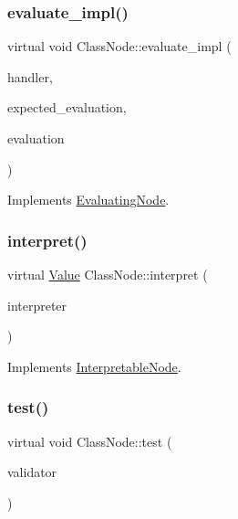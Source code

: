 \subsubsection{\texorpdfstring{evaluate\+\_\+impl()}{evaluate\_impl()}}
{\footnotesize\ttfamily virtual void Class\+Node\+::evaluate\+\_\+impl (\begin{DoxyParamCaption}\item[{\hyperlink{classSystemHandler}{System\+Handler} $\ast$}]{handler,  }\item[{\hyperlink{statics_8h_a6664c451ca7787483a7981cc1de68dbb}{E\+V\+A\+L\+U\+A\+T\+I\+O\+N\+\_\+\+T\+Y\+PE}}]{expected\+\_\+evaluation,  }\item[{struct \hyperlink{structEvaluation}{Evaluation} $\ast$}]{evaluation }\end{DoxyParamCaption})\hspace{0.3cm}{\ttfamily [virtual]}}



Implements \hyperlink{classEvaluatingNode_a085fa06e0b46a93c814dc55cda0c1b26}{Evaluating\+Node}.

\mbox{\label{classClassNode_a7515421face64d74e99e180fb297684b}} 
\subsubsection{\texorpdfstring{interpret()}{interpret()}}
{\footnotesize\ttfamily virtual \hyperlink{classValue}{Value} Class\+Node\+::interpret (\begin{DoxyParamCaption}\item[{\hyperlink{classInterpreter}{Interpreter} $\ast$}]{interpreter }\end{DoxyParamCaption})\hspace{0.3cm}{\ttfamily [virtual]}}



Implements \hyperlink{classInterpretableNode_a9a466e7d65c4b323d2b96b4ac8396cd7}{Interpretable\+Node}.

\mbox{\label{classClassNode_ac5147024d81a0c6841e9453025e4f988}} 
\subsubsection{\texorpdfstring{test()}{test()}}
{\footnotesize\ttfamily virtual void Class\+Node\+::test (\begin{DoxyParamCaption}\item[{\hyperlink{classValidator}{Validator} $\ast$}]{validator }\end{DoxyParamCaption})\hspace{0.3cm}{\ttfamily [virtual]}}



